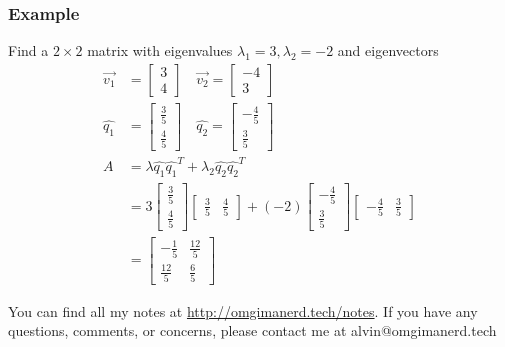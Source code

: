 \documentclass{math}
\begin{document}
\subsubsection*{Example}
Find a \( 2\times2 \) matrix with eigenvalues \( \lambda_1 = 3,\lambda_2 = -2 \)
and eigenvectors
\begin{align*}
  \vec{v_1} &= \begin{bmatrix}3 \\ 4\end{bmatrix} \quad
    \vec{v_2} = \begin{bmatrix}-4 \\ 3\end{bmatrix} \\
  \hat{q_1} &= \begin{bmatrix}\frac{3}{5} \\ \frac{4}{5}\end{bmatrix} \quad
    \hat{q_2} = \begin{bmatrix}-\frac{4}{5} \\ \frac{3}{5}\end{bmatrix} \\
  A &= \lambda\hat{q_1}\hat{q_1}^T+\lambda_2\hat{q_2}\hat{q_2}^T \\
  &= 3\begin{bmatrix}\frac{3}{5} \\ \frac{4}{5}\end{bmatrix}
    \begin{bmatrix}\frac{3}{5} & \frac{4}{5}\end{bmatrix}+
    (-2)\begin{bmatrix}-\frac{4}{5} \\ \frac{3}{5}\end{bmatrix}
    \begin{bmatrix}-\frac{4}{5} & \frac{3}{5}\end{bmatrix} \\
  &= \begin{bmatrix}
    -\frac{1}{5} & \frac{12}{5} \\
    \frac{12}{5} & \frac{6}{5}
  \end{bmatrix}
\end{align*}

\begin{center}
  You can find all my notes at \url{http://omgimanerd.tech/notes}. If you have
  any questions, comments, or concerns, please contact me at
  alvin@omgimanerd.tech
\end{center}
\end{document}
